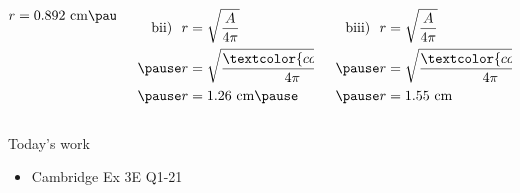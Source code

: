 \documentclass[aspectratio=169,10pt]{beamer}
\begin{document}
\begin{frame}
\begin{solution}[]
\begin{columns}[t]
\begin{column}{.2\textwidth}
\[\begin{aligned}
          r&=0.892\text{ cm}\pause
        \end{aligned}
        \]
      \end{column}
      \begin{column}{.2\textwidth}
        \vspace{-2em}
        \[
        \begin{aligned}
          \text{bii) }\  r&=\sqrt{\frac{A}{4\pi}}\\\pause
          r&=\sqrt{\frac{\textcolor{col4}{20}}{4\pi}}\\\pause
          r&=1.26\text{ cm}\pause
        \end{aligned}
        \]
      \end{column}
      \begin{column}{.2\textwidth}
        \vspace{-2em}
        \[
        \begin{aligned}
          \text{biii) }\  r&=\sqrt{\frac{A}{4\pi}}\\\pause
          r&=\sqrt{\frac{\textcolor{col4}{30}}{4\pi}}\\\pause
          r&=1.55\text{ cm}
        \end{aligned}
        \]
      \end{column}
    \end{columns}
  \end{solution}
\end{frame}

\begin{frame}{Today's work}
  \begin{itemize} 
    \item Cambridge Ex 3E Q1-21
  \end{itemize}
\end{frame}
\end{document}
